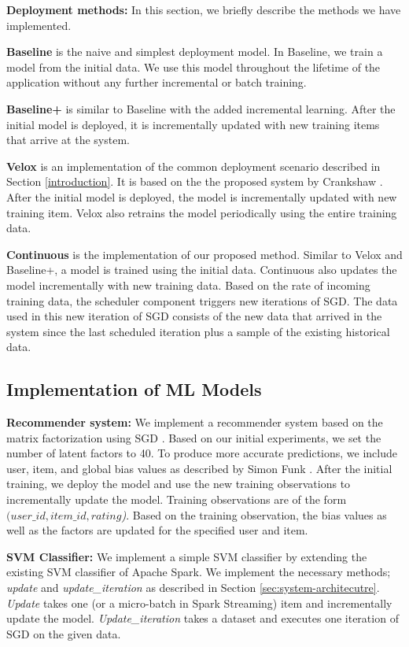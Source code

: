 \documentclass[10pt,conference,letterpaper]{IEEEtran}
\begin{document}
\textbf{Deployment methods:} In this section, we briefly describe the methods we have implemented.

\textbf{Baseline} is the naive and simplest deployment model. 
In Baseline, we train a model from the initial data.
We use this model throughout the lifetime of the application without any further incremental or batch training.

\textbf{Baseline+} is similar to Baseline with the added incremental learning.
After the initial model is deployed, it is incrementally updated with new training items that arrive at the system.

\textbf{Velox} is an implementation of the common deployment scenario described in Section \ref{introduction}.
It is based on the the proposed system by Crankshaw \cite{crankshaw2014missing}. 
After the initial model is deployed, the model is incrementally updated with new training item.
Velox also retrains the model periodically using the entire training data.


\textbf{Continuous} is the implementation of our proposed method. 
Similar to Velox and Baseline+, a model is trained using the initial data.
Continuous also updates the model incrementally with new training data.
Based on the rate of incoming training data, the scheduler component triggers new iterations of SGD.
The data used in this new iteration of SGD consists of the new data that arrived in the system since the last scheduled iteration plus a sample of the existing historical data.

\subsection{Implementation of ML Models}

\textbf{Recommender system:} We implement a recommender system based on the matrix factorization using SGD \cite{funk2006netflix}.
Based on our initial experiments, we set the number of latent factors to 40.
To produce more accurate predictions, we include user, item, and global bias values as described by Simon Funk \cite{koren2009matrix}.
After the initial training, we deploy the model and use the new training observations to incrementally update the model.
Training observations are of the form \textit{\((user\_id, item\_id, rating\))}.
Based on the training observation, the bias values as well as the factors are updated for the specified user and item.

\textbf{SVM Classifier:} We implement a simple SVM classifier by extending the existing SVM classifier of Apache Spark.
We implement the necessary methods; \textit{update} and \textit{update\_iteration} as described in Section \ref{sec:system-architecutre}.
\textit{Update} takes one (or a micro-batch in Spark Streaming) item and incrementally update the model.
\textit{Update\_iteration} takes a dataset and executes one iteration of SGD on the given data.
\end{document}
